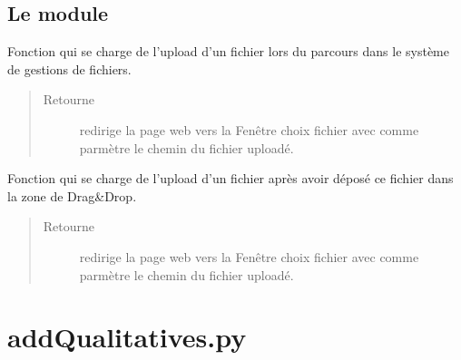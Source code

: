 \documentclass[letterpaper,10pt,french]{sphinxmanual}
\begin{document}
\section{Le module }
\label{\detokenize{choixFichier:le-module-fenetre-choix-fichier}}

\begin{fulllineitems}
\label{\detokenize{choixFichier:interface_web.choixFichier.FileWithSGF}}
Fonction qui se charge de l’upload d’un fichier lors du parcours dans le système de gestions de fichiers.
\begin{quote}\begin{description}
\item[{Retourne}] \leavevmode
redirige la page web vers la Fenêtre choix fichier avec comme parmètre le chemin du fichier uploadé.

\end{description}\end{quote}

\end{fulllineitems}


\begin{fulllineitems}
\label{\detokenize{choixFichier:interface_web.choixFichier.FileWithDragDrop}}
Fonction qui se charge de l’upload d’un fichier après avoir déposé ce fichier dans la zone de Drag\&Drop.
\begin{quote}\begin{description}
\item[{Retourne}] \leavevmode
redirige la page web vers la Fenêtre choix fichier avec comme parmètre le chemin du fichier uploadé.

\end{description}\end{quote}

\end{fulllineitems}



\chapter{addQualitatives.py}
\label{\detokenize{addQualitatives:module-add.addQualitatives}}\label{\detokenize{addQualitatives::doc}}\label{\detokenize{addQualitatives:addqualitatives-py}}
\end{document}
